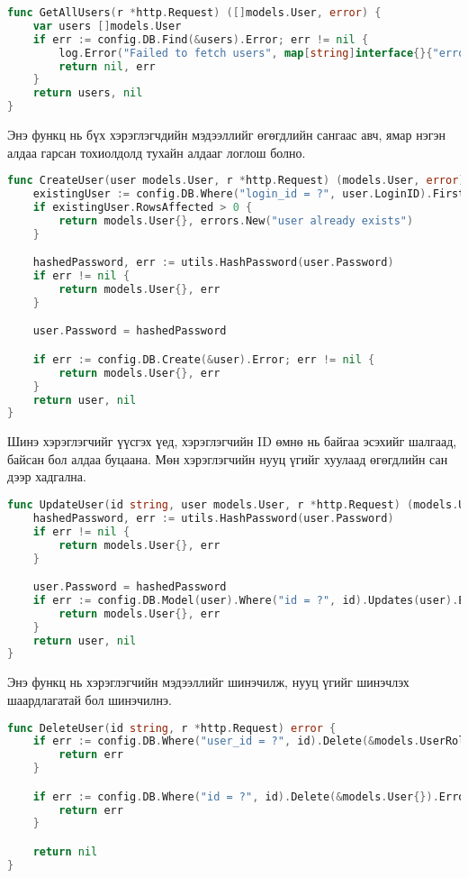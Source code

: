 \begin{lstlisting}[language=Go, caption=Get all users function, frame=single]
func GetAllUsers(r *http.Request) ([]models.User, error) {
	var users []models.User
	if err := config.DB.Find(&users).Error; err != nil {
		log.Error("Failed to fetch users", map[string]interface{}{"error": err.Error()}, r)
		return nil, err
	}
	return users, nil
}
\end{lstlisting}

Энэ функц нь бүх хэрэглэгчдийн мэдээллийг өгөгдлийн сангаас авч, ямар нэгэн алдаа гарсан тохиолдолд тухайн алдааг логлош болно.

\begin{lstlisting}[language=Go, caption=Create user function, frame=single]
func CreateUser(user models.User, r *http.Request) (models.User, error) {
	existingUser := config.DB.Where("login_id = ?", user.LoginID).First(&models.User{})
	if existingUser.RowsAffected > 0 {
		return models.User{}, errors.New("user already exists")
	}

	hashedPassword, err := utils.HashPassword(user.Password)
	if err != nil {
		return models.User{}, err
	}

	user.Password = hashedPassword

	if err := config.DB.Create(&user).Error; err != nil {
		return models.User{}, err
	}
	return user, nil
}
\end{lstlisting}

Шинэ хэрэглэгчийг үүсгэх үед, хэрэглэгчийн ID өмнө нь байгаа эсэхийг шалгаад, байсан бол алдаа буцаана. Мөн хэрэглэгчийн нууц үгийг хуулаад өгөгдлийн сан дээр хадгална.

\begin{lstlisting}[language=Go, caption=Update user function, frame=single]
func UpdateUser(id string, user models.User, r *http.Request) (models.User, error) {
	hashedPassword, err := utils.HashPassword(user.Password)
	if err != nil {
		return models.User{}, err
	}

	user.Password = hashedPassword
	if err := config.DB.Model(user).Where("id = ?", id).Updates(user).Error; err != nil {
		return models.User{}, err
	}
	return user, nil
}
\end{lstlisting}

Энэ функц нь хэрэглэгчийн мэдээллийг шинэчилж, нууц үгийг шинэчлэх шаардлагатай бол шинэчилнэ.

\begin{lstlisting}[language=Go, caption=Delete user function, frame=single]
func DeleteUser(id string, r *http.Request) error {
	if err := config.DB.Where("user_id = ?", id).Delete(&models.UserRole{}).Error; err != nil {
		return err
	}

	if err := config.DB.Where("id = ?", id).Delete(&models.User{}).Error; err != nil {
		return err
	}

	return nil
}
\end{lstlisting}

